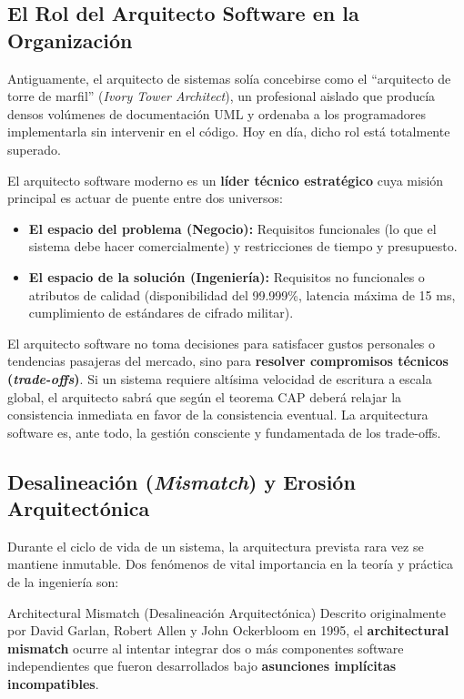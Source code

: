 \subsection{El Rol del Arquitecto Software en la Organización}

Antiguamente, el arquitecto de sistemas solía concebirse como el ``arquitecto de torre de marfil'' (\emph{Ivory Tower Architect}), un profesional aislado que producía densos volúmenes de documentación UML y ordenaba a los programadores implementarla sin intervenir en el código. Hoy en día, dicho rol está totalmente superado.

El arquitecto software moderno es un \textbf{líder técnico estratégico} cuya misión principal es actuar de puente entre dos universos:
\begin{itemize}[leftmargin=1.5em]
  \item \textbf{El espacio del problema (Negocio):} Requisitos funcionales (lo que el sistema debe hacer comercialmente) y restricciones de tiempo y presupuesto.
  \item \textbf{El espacio de la solución (Ingeniería):} Requisitos no funcionales o atributos de calidad (disponibilidad del 99.999\%, latencia máxima de 15 ms, cumplimiento de estándares de cifrado militar).
\end{itemize}

El arquitecto software no toma decisiones para satisfacer gustos personales o tendencias pasajeras del mercado, sino para \textbf{resolver compromisos técnicos (\emph{trade-offs})}. Si un sistema requiere altísima velocidad de escritura a escala global, el arquitecto sabrá que según el teorema CAP deberá relajar la consistencia inmediata en favor de la consistencia eventual. La arquitectura software es, ante todo, la gestión consciente y fundamentada de los trade-offs.

\subsection{Desalineación (\emph{Mismatch}) y Erosión Arquitectónica}

Durante el ciclo de vida de un sistema, la arquitectura prevista rara vez se mantiene inmutable. Dos fenómenos de vital importancia en la teoría y práctica de la ingeniería son:

\begin{definicion}{Architectural Mismatch (Desalineación Arquitectónica)}
Descrito originalmente por David Garlan, Robert Allen y John Ockerbloom en 1995, el \textbf{architectural mismatch} ocurre al intentar integrar dos o más componentes software independientes que fueron desarrollados bajo \textbf{asunciones implícitas incompatibles}.
\end{definicion}

